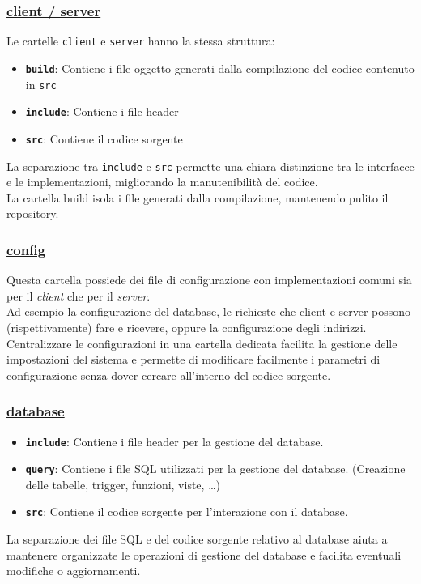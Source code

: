\documentclass[]{report}
\begin{document}
\subsubsection*{\underline{client / server}}
Le cartelle \texttt{client} e \texttt{server} hanno la stessa struttura:
\begin{itemize}
	\item \texttt{\textbf{build}}: Contiene i file oggetto generati dalla compilazione del codice contenuto in \texttt{src}
	\item \texttt{\textbf{include}}: Contiene i file header
	\item \texttt{\textbf{src}}: Contiene il codice sorgente
\end{itemize}
La separazione tra \texttt{include} e \texttt{src} permette una chiara distinzione tra le interfacce e le implementazioni, migliorando la manutenibilità del codice. \\
La cartella build isola i file generati dalla compilazione, mantenendo pulito il repository.

\subsubsection*{\underline{config}}
Questa cartella possiede dei file di configurazione con implementazioni comuni sia per il \textit{client} che per il \textit{server}.\\
Ad esempio la configurazione del database, le richieste che client e server possono (rispettivamente) fare e ricevere, oppure la configurazione degli indirizzi.\meskip
Centralizzare le configurazioni in una cartella dedicata facilita la gestione delle impostazioni del sistema e permette di modificare facilmente i parametri di configurazione senza dover cercare all'interno del codice sorgente.

\subsubsection*{\underline{database}}
\begin{itemize}
	\item \texttt{\textbf{include}}: Contiene i file header per la gestione del database.
	\item \texttt{\textbf{query}}: Contiene i file SQL utilizzati per la gestione del database. (Creazione delle tabelle, trigger, funzioni, viste, \dots)
	\item \texttt{\textbf{src}}: Contiene il codice sorgente per l'interazione con il database.
\end{itemize}
La separazione dei file SQL e del codice sorgente relativo al database aiuta a mantenere organizzate le operazioni di gestione del database e facilita eventuali modifiche o aggiornamenti.
\end{document}

